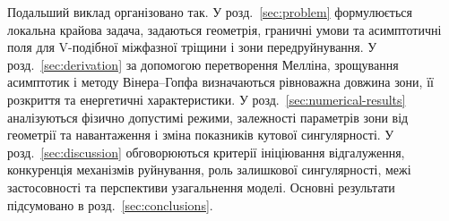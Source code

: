 Подальший виклад організовано так. У розд.~\ref{sec:problem}
формулюється локальна крайова задача, задаються геометрія, граничні
умови та асимптотичні поля для V-подібної міжфазної тріщини і зони
передруйнування. У розд.~\ref{sec:derivation} за допомогою перетворення
Мелліна, зрощування асимптотик і методу Вінера--Гопфа визначаються
рівноважна довжина зони, її розкриття та енергетичні характеристики. У
розд.~\ref{sec:numerical-results} аналізуються фізично допустимі режими,
залежності параметрів зони від геометрії та навантаження і зміна
показників кутової сингулярності. У розд.~\ref{sec:discussion}
обговорюються критерії ініціювання відгалуження, конкуренція механізмів
руйнування, роль залишкової сингулярності, межі застосовності та
перспективи узагальнення моделі. Основні результати підсумовано в
розд.~\ref{sec:conclusions}.
